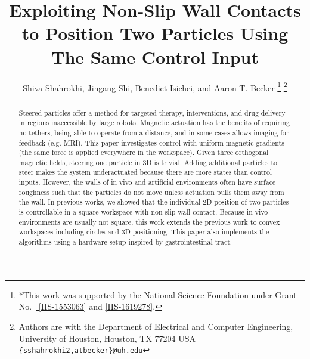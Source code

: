 \documentclass[letterpaper, 10 pt, conference]{ieeeconf}
\title{\LARGE \bf Exploiting Non-Slip Wall Contacts \\  to Position Two Particles Using The Same Control Input}
\author{Shiva Shahrokhi, Jingang Shi,  Benedict Isichei, and Aaron T. Becker%
\thanks{*This work was supported by the National Science Foundation under Grant No.\ \href{http://nsf.gov/awardsearch/showAward?AWD_ID=1553063}{ [IIS-1553063]} and \href{http://nsf.gov/awardsearch/showAward?AWD_ID=1619278}{[IIS-1619278]}.}%
\thanks{Authors are with the Department of Electrical and Computer Engineering,  University of Houston, Houston, TX 77204 USA        {\tt\small  \{sshahrokhi2,atbecker\}@uh.edu}}%
}
\begin{document}
\maketitle
\thispagestyle{empty}
\pagestyle{empty}


\begin{abstract}


Steered particles offer a method for targeted therapy, interventions, and drug delivery in regions inaccessible by large robots.
Magnetic actuation has the benefits of requiring no tethers, being able to operate from a distance, and in some cases allows imaging for feedback (e.g. MRI).
 This paper investigates control with uniform magnetic gradients (the same force is applied everywhere in the workspace).
Given three orthogonal magnetic fields, steering one particle in 3D is trivial. 
Adding additional particles to steer makes the system underactuated because there are more states than control inputs. 
However, the walls of in vivo and artificial environments often have surface roughness such that the particles do not move unless actuation pulls them away from the wall.
In previous works, we showed that the individual 2D position of two particles is controllable in a square workspace with non-slip wall contact. 
Because in vivo environments are usually not square, this work extends the previous work to convex workspaces including circles and 3D positioning. 
This paper also implements the algorithms using a hardware setup inspired by gastrointestinal tract.





\end{abstract}
\end{document}
